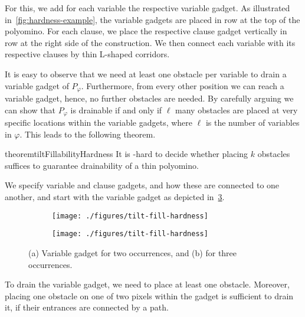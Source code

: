 \documentclass[a4paper,UKenglish,cleveref,thm-restate]{lipics-v2021}
\begin{document}
For this, we add for each variable the respective variable gadget. 
As illustrated in~\cref{fig:hardness-example}, the variable gadgets are placed in row at the top of the polyomino. 
For each clause, we place the respective clause gadget vertically in row at the right side of the construction. 
We then connect each variable with its respective clauses by thin L-shaped corridors.

It is easy to observe that we need at least one obstacle per variable to drain a variable gadget of $P_\varphi$.
Furthermore, from every other position we can reach a variable gadget, hence, no further obstacles are needed.
By carefully arguing we can show that $P_{\varphi}$ is drainable if and only if $\ell$ many obstacles are placed at very specific locations within the variable gadgets, where $\ell$ is the number of variables in $\varphi$.
This leads to the following theorem.

\begin{restatable}{theorem}{tiltFillabilityHardness}\label{thm:hardness}
	It is \NP-hard to decide whether placing $k$ obstacles suffices to guarantee drainability of a thin polyomino.
\end{restatable}

We specify variable and clause gadgets, and how these are connected to one another, and start with the variable gadget as depicted in~\cref{fig:hardness-variables}.

\begin{figure}[ht]
	\captionsetup[subfigure]{justification=centering}
	\begin{subfigure}[b]{0.43\columnwidth}\centering
		\texttt{[image: ./figures/tilt-fill-hardness]}
		\caption{}
		\label{fig:hardness-variables_a}
	\end{subfigure}\begin{subfigure}[b]{0.57\columnwidth}\centering \texttt{[image: ./figures/tilt-fill-hardness]}\caption{}
		\label{fig:hardness-variables_b}
	\end{subfigure}\caption{(a) Variable gadget for two occurrences, and (b) for three occurrences.}
	\label{fig:hardness-variables}
\end{figure}

\begin{lemma}
	\label{lem:obstacleForVariable}
	To drain the variable gadget, we need to place at least one obstacle.
	Moreover, placing one obstacle on one of two pixels within the gadget is sufficient to drain it, if their entrances are connected by a path.
\end{lemma}
\end{document}
